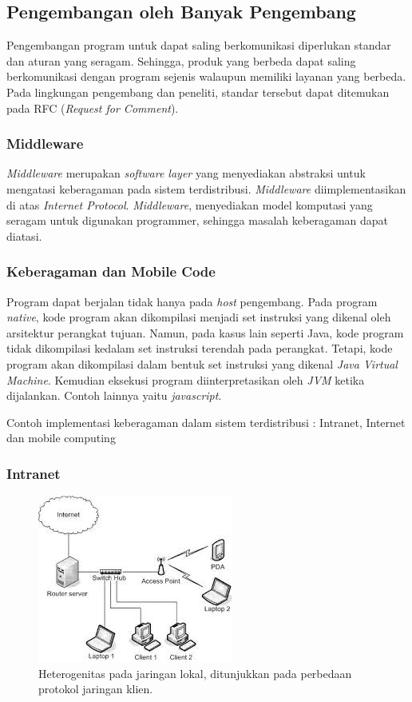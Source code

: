 \documentclass[12pt,a4paper]{apa}
\begin{document}
	\subsection{\textbf{Pengembangan oleh Banyak Pengembang}}
	Pengembangan program untuk dapat saling berkomunikasi diperlukan standar dan aturan yang seragam. Sehingga, produk yang berbeda dapat saling berkomunikasi dengan program sejenis walaupun memiliki layanan yang berbeda. Pada lingkungan pengembang dan peneliti, standar tersebut dapat ditemukan pada RFC (\emph{Request for Comment}).
	\subsubsection{\textbf{Middleware}}
	\emph{Middleware} merupakan \emph{software layer} yang menyediakan abstraksi untuk mengatasi keberagaman pada sistem terdistribusi. \emph{Middleware} diimplementasikan di atas \emph{Internet Protocol}. \emph{Middleware}, menyediakan model komputasi yang seragam untuk digunakan programmer, sehingga masalah keberagaman dapat diatasi. \cite{Coulouris2012}
	\subsubsection{\textbf{Keberagaman dan Mobile Code}}
	Program dapat berjalan tidak hanya pada \emph{host} pengembang. Pada program \emph{native}, kode program akan dikompilasi menjadi set instruksi yang dikenal oleh arsitektur perangkat tujuan. Namun, pada kasus lain  seperti Java, kode program tidak dikompilasi kedalam set instruksi terendah pada perangkat. Tetapi, kode program akan dikompilasi dalam bentuk set instruksi yang dikenal \emph{Java Virtual Machine}. Kemudian eksekusi program diinterpretasikan oleh \emph{JVM} ketika dijalankan. Contoh lainnya yaitu \emph{javascript}. \cite{Coulouris2012}
	
	Contoh implementasi keberagaman dalam sistem terdistribusi : Intranet, Internet dan mobile computing \cite{Kamalapur2008}
	\subsubsection{\textbf{Intranet}}
		\begin{figure}[h]
		\centering
		\includegraphics[width=0.5\linewidth]{img/heteroLAN}
		\caption{Heterogenitas pada jaringan lokal, ditunjukkan pada perbedaan protokol jaringan klien.}
		\label{fig:heteroLAN}
		\end{figure}
\end{document}
